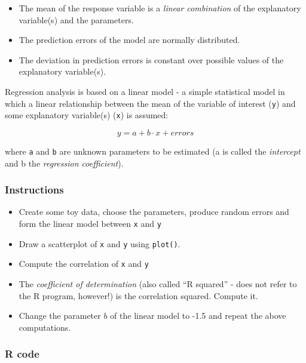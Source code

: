\documentclass[]{article}
\providecommand{\tightlist}{%
  \setlength{\itemsep}{0pt}\setlength{\parskip}{0pt}}
\begin{document}
\begin{itemize}
\tightlist
\item
  The mean of the response variable is a \emph{linear combination} of
  the explanatory variable(s) and the parameters.
\item
  The prediction errors of the model are normally distributed.
\item
  The deviation in prediction errors is constant over possible values of
  the explanatory variable(s).
\end{itemize}

Regression analysis is based on a linear model - a simple statistical
model in which a linear relationship between the mean of the variable of
interest (\texttt{y}) and some explanatory variable(s) (\texttt{x}) is
assumed:

\[y = a + b \cdot x + errors\]

where \texttt{a} and \texttt{b} are unknown parameters to be estimated
(a is called the \emph{intercept} and b the \emph{regression
coefficient}).

\hypertarget{instructions-2}{%
\subsubsection{Instructions}\label{instructions-2}}

\begin{itemize}
\tightlist
\item
  Create some toy data, choose the parameters, produce random errors and
  form the linear model between \texttt{x} and \texttt{y}
\item
  Draw a scatterplot of \texttt{x} and \texttt{y} using \texttt{plot()}.
\item
  Compute the correlation of \texttt{x} and \texttt{y}
\item
  The \emph{coefficient of determination} (also called ``R squared'' -
  does not refer to the R program, however!) is the correlation squared.
  Compute it.
\item
  Change the parameter \(b\) of the linear model to -1.5 and repeat the
  above computations.
\end{itemize}

\hypertarget{r-code-2}{%
\subsubsection{R code}\label{r-code-2}}
\end{document}
